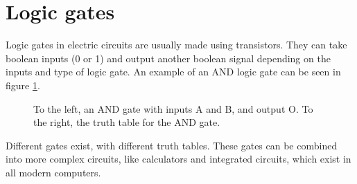 \section{Logic gates}
Logic gates in electric circuits are usually made using transistors. They can take boolean inputs (0 or 1) and output another boolean signal depending on the inputs and type of logic gate. An example of an AND logic gate can be seen in figure \ref{and_gate}.

\begin{figure}[H]
\centering

\label{and_gate}
\caption{To the left, an AND gate with inputs A and B, and output O. To the right, the truth table for the AND gate.}
\end{figure}

Different gates exist, with different truth tables. These gates can be combined into more complex circuits, like calculators and integrated circuits, which exist in all modern computers.
